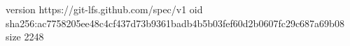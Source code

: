 version https://git-lfs.github.com/spec/v1
oid sha256:ac7758205ee48c4cf437d73b9361badb4b5b03fef60d2b0607fc29c687a69b08
size 2248
